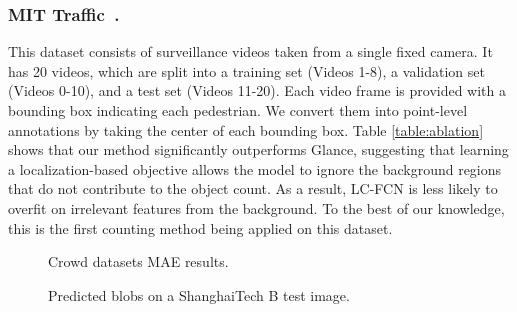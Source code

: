 \documentclass[runningheads]{llncs}
\begin{document}
\subsubsection{MIT Traffic~\cite{wang2011automatic}.} This dataset consists of surveillance videos taken from a single fixed camera. It has 20 videos, which are split into a training set (Videos 1-8), a validation set (Videos 0-10), and a test set (Videos 11-20). Each video frame is provided with a bounding box indicating each pedestrian. We convert them into point-level annotations by taking the center of each bounding box. Table \ref{table:ablation} shows that our method significantly outperforms Glance, suggesting that learning a localization-based objective allows the model to ignore the background regions that do not contribute to the object count. As a result, LC-FCN is less likely to overfit on irrelevant features from the background. To the best of our knowledge, this is the first counting method being applied on this dataset.



\begin{figure}[t]
\begin{floatrow}
{\caption{Crowd datasets MAE results.} \label{tab:crowd}}
{\caption{Predicted blobs on a ShanghaiTech B test image.} \label{fig:qual_shanghai}}
\end{floatrow}
\end{figure}\textbf{}
\end{document}
